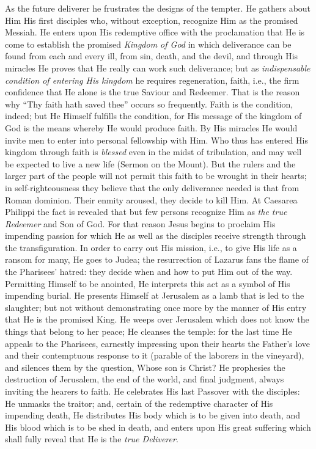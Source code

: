As the future deliverer he frustrates the designs of the tempter. He gathers about Him His first disciples who, without exception, recognize Him as the promised Messiah. He enters upon His redemptive office with the proclamation that He is come to establish the promised \emph{Kingdom of God} in which deliverance can be found from each and every ill, from sin, death, and the devil, and through His miracles He proves that He really can work such deliverance; but as \emph{indispensable condition of entering His kingdom} he requires regeneration, faith, i.e., the firm confidence that He alone is the true Saviour and Redeemer. That is the reason why “Thy faith hath saved thee” occurs so frequently. Faith is the condition, indeed; but He Himself fulfills the condition, for His message of the kingdom of God is the means
whereby He would produce faith. By His miracles He would invite men to enter into personal fellowship with Him. Who thus has entered His kingdom through faith is \emph{blessed} even in the midst of tribulation, and may well be expected to live a new life (Sermon on the Mount). But the rulers and the larger part of the people will not permit this faith to be wrought in their hearts; in self-righteousness they believe that the only deliverance needed is that from Roman dominion. Their enmity aroused, they decide to kill Him. At Caesarea Philippi the fact is revealed that but few persons recognize Him as \emph{the true Redeemer} and Son of God. For that reason Jesus begins to proclaim His impending passion for which He as well as the disciples receive strength through the transfiguration. In order to carry out His mission, i.e., to give His life as a ransom for many, He goes to Judea; the resurrection of Lazarus fans the flame of the Pharisees’ hatred: they decide when and how to put Him out of the way. Permitting Himself to be anointed, He interprets this act as a symbol of His impending burial. He presents Himself at Jerusalem as a lamb that is led to the slaughter; but not without demonstrating once more by the manner of His entry that He is the promised King. He weeps over Jerusalem which does not know the things that belong to her peace; He cleanses the temple: for the last time He appeals to the Pharisees, earnestly impressing upon their hearts the Father’s love and their contemptuous response to it (parable of the laborers in the vineyard), and silences them by the question, Whose son is Christ? He prophesies the destruction of Jerusalem, the end of the world, and final judgment, always inviting the hearers to faith. He celebrates His last Passover with the disciples: He unmasks the traitor; and, certain of the redemptive character of His impending death, He distributes His body which is to be given into death, and His blood which is to be shed in death, and enters upon His great suffering which shall fully reveal that He is the \emph{true Deliverer}.

